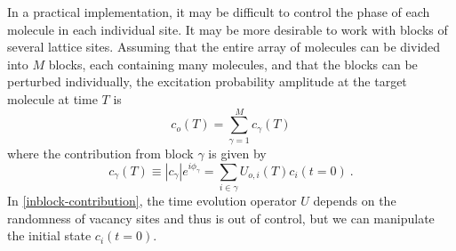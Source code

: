 In a practical implementation, it may be difficult to control the phase of each molecule in each
individual site. It may be more desirable to work with blocks of several lattice sites. Assuming that the entire array of molecules 
can be divided into $M$ blocks, each containing many molecules, and that the blocks can be perturbed individually, the excitation probability amplitude at the target molecule at time $T$ is 
%
\begin{equation} c_{o}(T) =  \sum_{\gamma=1}^M c_{\gamma}(T)
\label{blocks-contribution}
\end{equation}
%
where the contribution from block $\gamma$ is given by
%
\begin{equation} c_\gamma(T) \equiv |c_\gamma| e^{i\phi_\gamma}= \sum_{i\in
 \gamma} U_{o, i}(T)c_i(t=0) \ .
\label{inblock-contribution}
\end{equation}
In \autoref{inblock-contribution}, the time evolution operator $U$ depends on the randomness of vacancy sites 
and thus is out of control, but we can manipulate the initial state $c_i(t=0)$. 
%
%
%
